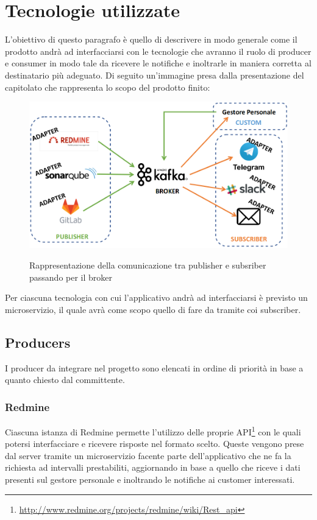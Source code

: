 \newpage
\section{Tecnologie utilizzate}
	L'obiettivo di questo paragrafo è quello di descrivere in modo generale come il prodotto andrà ad interfacciarsi con le tecnologie che avranno il ruolo di producer e consumer in modo tale da ricevere le notifiche e inoltrarle in maniera corretta al destinatario più adeguato.
	Di seguito un'immagine presa dalla presentazione del capitolato che rappresenta lo scopo del prodotto finito:
	\vspace{-0.4cm}
	\begin{figure}[H]
		\centering
		\includegraphics[width=\columnwidth]{img/butterfly.png}\\
		\caption{Rappresentazione della comunicazione tra publisher e subsriber passando per il broker}
	\end{figure}

	Per ciascuna tecnologia con cui l'applicativo andrà ad interfacciarsi è previsto un microservizio, il quale avrà come scopo quello di fare da tramite coi subscriber.

	\subsection{Producers}
		I producer da integrare nel progetto sono elencati in ordine di priorità in base a quanto chiesto dal committente.

		\subsubsection{Redmine}
		Ciascuna istanza di Redmine permette l'utilizzo delle proprie API\footnote{\url{http://www.redmine.org/projects/redmine/wiki/Rest_api}} con le quali potersi interfacciare e ricevere risposte nel formato scelto.
		Queste vengono prese dal server tramite un microservizio facente parte dell'applicativo che ne fa la richiesta ad intervalli prestabiliti, aggiornando in base a quello che riceve i dati presenti sul gestore personale e inoltrando le notifiche ai customer interessati.
		
